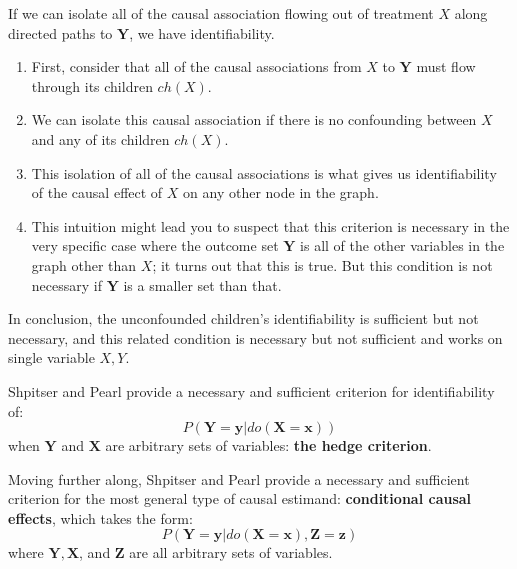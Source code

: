 If we can isolate all of the causal association flowing out of treatment $X$ along
directed paths to $\mathbf{Y}$, we have identifiability.
\begin{enumerate}
    \item First, consider that all of the causal associations from $X$ to $\mathbf{Y}$
          must flow through its children $ch(X)$.
    \item We can isolate this causal association if there is no confounding between
          $X$ and any of its children $ch(X)$.
    \item This isolation of all of the causal associations is what gives us
          identifiability of the causal effect of $X$ on any other node in the graph.
    \item This intuition might lead you to suspect that this criterion is necessary
          in the very specific case where the outcome set $\mathbf{Y}$ is all of
          the other variables in the graph other than $X$; it turns out that this
          is true. But this condition is not necessary if $\mathbf{Y}$ is a smaller
          set than that.
\end{enumerate}

In conclusion, the unconfounded children's identifiability is sufficient but not
necessary, and this related condition is necessary but not sufficient and works
on single variable $X, Y$.

Shpitser and Pearl provide a necessary and sufficient criterion for identifiability of:
\begin{equation}
    P(\mathbf{Y} = \mathbf{y}|do(\mathbf{X} = \mathbf{x}))
\end{equation}
when $\mathbf{Y}$ and $\mathbf{X}$ are arbitrary sets of variables: \textbf{the hedge criterion}.

Moving further along, Shpitser and Pearl provide a necessary and sufficient criterion
for the most general type of causal estimand: \textbf{conditional causal effects},
which takes the form:
\begin{equation}
    P(\mathbf{Y} = \mathbf{y}|do(\mathbf{X} = \mathbf{x}), \mathbf{Z} = \mathbf{z})
\end{equation}
where $\mathbf{Y}, \mathbf{X}$, and $\mathbf{Z}$ are all arbitrary sets of variables.